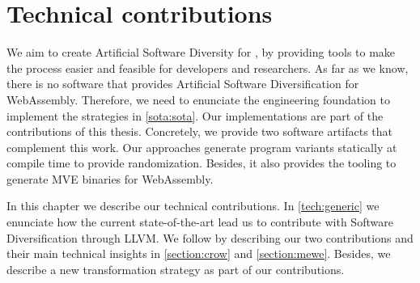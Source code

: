 \chapter{Technical contributions}
\label{chapter:technical}


We aim to create Artificial Software Diversity for \wasm, by providing tools to make the process easier and feasible for developers and researchers. As far as we know, there is no software that provides Artificial Software Diversification for WebAssembly. Therefore, we need to enunciate the engineering foundation to implement the strategies in \autoref{sota:sota}. Our implementations are part of the contributions of this thesis. Concretely, we provide two software artifacts that complement this work. Our approaches generate \wasm program variants statically at compile time to provide randomization. Besides, it also provides the tooling to generate MVE binaries for WebAssembly.


In this chapter we describe our technical contributions. In \autoref{tech:generic} we enunciate how the current state-of-the-art lead us to contribute with Software Diversification through LLVM. We follow by describing our two contributions and their main technical insights in \autoref{section:crow} and \autoref{section:mewe}. Besides, we describe a new transformation strategy as part of our contributions. 















